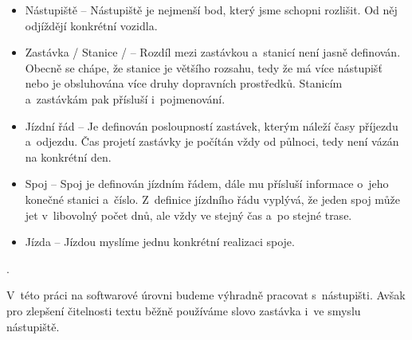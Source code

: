 \begin{itemize}

	\item Nástupiště -- Nástupiště je nejmenší bod, který jsme schopni rozlišit. Od něj odjíždějí konkrétní vozidla.

	\item Zastávka / Stanice / -- Rozdíl mezi zastávkou a~stanicí není jasně definován. Obecně se chápe, že stanice je většího rozsahu, tedy že má více nástupišť nebo je obsluhována více druhy dopravních prostředků. Stanicím a~zastávkám pak přísluší i~pojmenování.

	\item Jízdní řád -- Je definován posloupností zastávek, kterým náleží časy příjezdu a~odjezdu. Čas projetí zastávky je počítán vždy od půlnoci, tedy není vázán na konkrétní den.

	\item Spoj -- Spoj je definován jízdním řádem, dále mu přísluší informace o~jeho konečné stanici a~číslo. Z~definice jízdního řádu vyplývá, že jeden spoj může jet v~libovolný počet dnů, ale vždy ve stejný čas a~po stejné trase.

	\item Jízda -- Jízdou myslíme jednu konkrétní realizaci spoje.

\end{itemize}.

V~této práci na softwarové úrovni budeme výhradně pracovat s~nástupišti. Avšak pro zlepšení čitelnosti textu běžně používáme slovo zastávka i~ve smyslu nástupiště.

